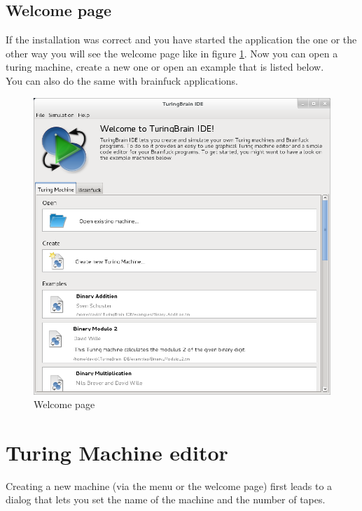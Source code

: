 \documentclass[%
  a4paper,%
  11pt,%
  blue,%
  hyperref	%
  ]{tubsartcl}
\begin{document}
\clearpage

\subsection{Welcome page}
\label{sec:welcome-page}
If the installation was correct and you have started the application the one or the other way you will see the welcome page like in figure \ref{pic:welcome_page}. Now you can open a turing machine, create a new one or open an example that is listed below. \\
You can also do the same with brainfuck applications.
\begin{figure}[!htb]
\begin{center}
\includegraphics[scale=0.45]{graphics_gui/welcomescreen.png}
\end{center}
\caption{Welcome page}
\label{pic:welcome_page}
\end{figure}

\clearpage

\section{Turing Machine editor}
Creating a new machine (via the menu or the welcome page) first leads to a dialog that lets you set the name of the machine and the number of tapes.
\end{document}

